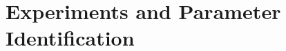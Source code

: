 \section{Experiments and Parameter Identification}
\label{sec:experimentsparameteridentification}

% 
% 
% 
% 
% 
